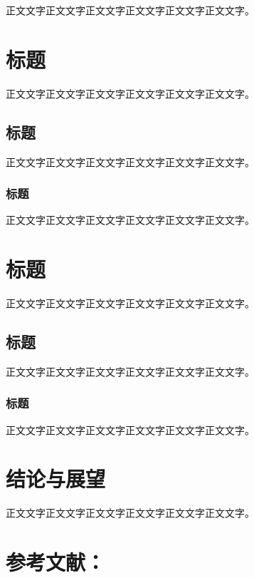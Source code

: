 \documentclass[a4paper,12pt]{ctexart}
\begin{document}
正文文字正文文字正文文字正文文字正文文字正文文字。

\section{标题}

正文文字正文文字正文文字正文文字正文文字正文文字。

\subsection{标题}

正文文字正文文字正文文字正文文字正文文字正文文字。

\subsubsection{标题}

正文文字正文文字正文文字正文文字正文文字正文文字。

\section{标题}

正文文字正文文字正文文字正文文字正文文字正文文字。

\subsection{标题}

正文文字正文文字正文文字正文文字正文文字正文文字。

\subsubsection{标题}

正文文字正文文字正文文字正文文字正文文字正文文字。

\section*{结论与展望}

正文文字正文文字正文文字正文文字正文文字正文文字。

\clearpage
\section*{参考文献：}
\fontsize{10.5pt}{10.5pt}\selectfont
\end{document}
